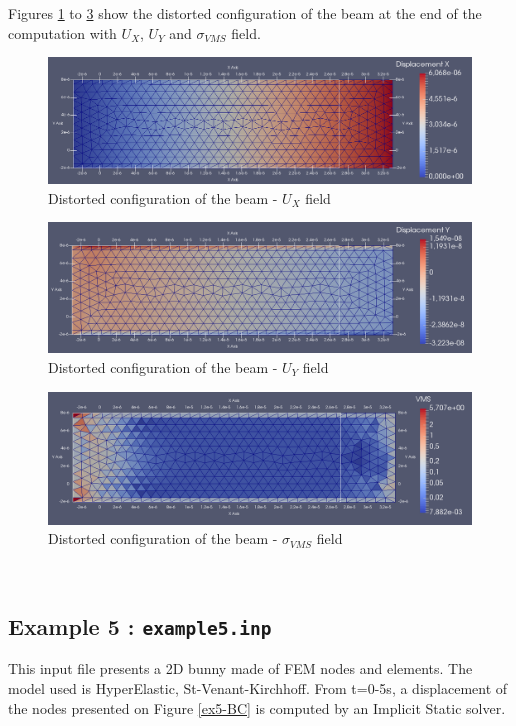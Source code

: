 \documentclass[oneside,11pt,times]{book}
\begin{document}
Figures \ref{ex4Ux} to \ref{ex4VMS} show the distorted configuration of the beam at the end of the computation with $U_{X}$, $U_Y$ and $\sigma_{VMS}$ field.

\begin{figure}[h!]
    \centering
    \includegraphics[scale=0.35]{imgs/Examples/ex4Ux.png}
    \caption{Distorted configuration of the beam  -  $U_{X}$ field}
    \label{ex4Ux}
\end{figure}

\begin{figure}[h!]
    \centering
    \includegraphics[scale=0.35]{imgs/Examples/ex4Uy.png}
    \caption{Distorted configuration of the beam  -  $U_{Y}$ field}
    \label{ex4Uy}
\end{figure}

\begin{figure}[h!]
    \centering
    \includegraphics[scale=0.35]{imgs/Examples/ex4-VMS.png}
    \caption{Distorted configuration of the beam  -  $\sigma_{VMS}$ field}
    \label{ex4VMS}
\end{figure}

\newpage
~
\newpage
\subsection{Example 5 : \texttt{example5.inp}}
This input file presents a 2D bunny made of FEM nodes and elements. The model used is HyperElastic, St-Venant-Kirchhoff. From t=0-5s, a displacement of the nodes presented on Figure \ref{ex5-BC} is computed by an Implicit Static solver.
\end{document}
